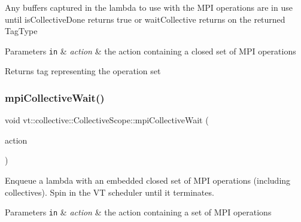 Any buffers captured in the lambda to use with the M\+PI operations are in use until {\ttfamily is\+Collective\+Done} returns {\ttfamily true} or {\ttfamily wait\+Collective} returns on the returned {\ttfamily Tag\+Type} 


\begin{DoxyParams}[1]{Parameters}
\mbox{\tt in}  & {\em action} & the action containing a closed set of M\+PI operations\\
\hline
\end{DoxyParams}
\begin{DoxyReturn}{Returns}
tag representing the operation set 
\end{DoxyReturn}
\mbox{\label{structvt_1_1collective_1_1_collective_scope_a0ef41233afe63fc9ead8431e226af193}} 
\subsubsection{\texorpdfstring{mpi\+Collective\+Wait()}{mpiCollectiveWait()}}
{\footnotesize\ttfamily void vt\+::collective\+::\+Collective\+Scope\+::mpi\+Collective\+Wait (\begin{DoxyParamCaption}\item[{\hyperlink{namespacevt_ae0a5a7b18cc99d7b732cb4d44f46b0f3}{Action\+Type}}]{action }\end{DoxyParamCaption})}



Enqueue a lambda with an embedded closed set of M\+PI operations (including collectives). Spin in the VT scheduler until it terminates. 


\begin{DoxyParams}[1]{Parameters}
\mbox{\tt in}  & {\em action} & the action containing a set of M\+PI operations \\
\hline
\end{DoxyParams}
\mbox{\label{structvt_1_1collective_1_1_collective_scope_a4a756e93437119e20a72dfe0d9ede190}} 

